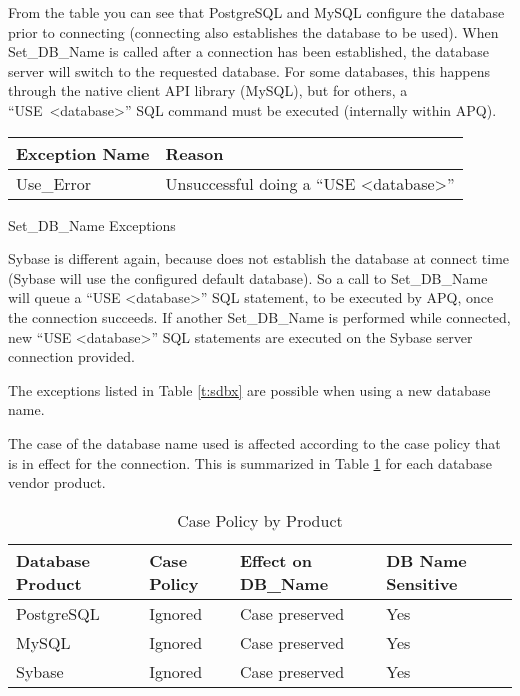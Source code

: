 \documentclass[english,letterpaper]{book}
\begin{document}
From the table you can see that PostgreSQL and MySQL configure the
database prior to connecting (connecting also establishes the database
to be used). When Set\_\-DB\_\-Name is called after a connection has been
established, the database server will switch to the requested database.
For some databases, this happens through the native client API library
(MySQL), but for others, a ``USE~<database>'' SQL command must
be executed (internally within APQ).

\begin{floatingtable}{
   \begin{tabular}{ll}
   Exception Name    &  Reason\\
   \hline 
   Use\_Error        &  Unsuccessful doing a ``USE <database>''\\
   \end{tabular}}
   \caption{Set\_DB\_Name Exceptions}\label{t:sdbx}
\end{floatingtable}

Sybase is different again, because does not establish the database
at connect time (Sybase will use the configured default database).
So a call to Set\_DB\_Name will queue a ``USE <database>'' SQL
statement, to be executed by APQ, once the connection succeeds. If
another Set\_DB\_Name is performed while connected, new ``USE <database>''
SQL statements are executed on the Sybase server connection provided.

The exceptions listed in Table \ref{t:sdbx} are possible when
using a new database name.

The case of the database name used is affected according to the case policy
that is in effect for the connection. This is summarized in Table \ref{t:cpol}
for each database vendor product.

\begin{table}
   \begin{center}
      \begin{tabular}{llll}
      Database Product  &  Case Policy          &  Effect on DB\_Name      &  DB Name Sensitive\\
      \hline 
      PostgreSQL        &  Ignored              &  Case preserved          &  Yes\\
      MySQL             &  Ignored              &  Case preserved          &  Yes\\
      Sybase            &  Ignored              &  Case preserved          &  Yes\\
      \end{tabular}
   \end{center}
   \caption{Case Policy by Product}\label{t:cpol}
\end{table}
\end{document}
